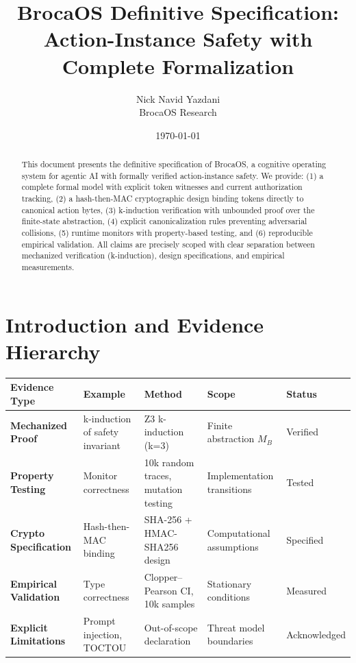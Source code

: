 \documentclass[12pt]{article}
\title{BrocaOS Definitive Specification: Action-Instance Safety with Complete Formalization}
\author{Nick Navid Yazdani\\BrocaOS Research}
\date{\today}
\begin{document}
\maketitle

\begin{abstract}
This document presents the definitive specification of BrocaOS, a cognitive operating system for agentic AI with formally verified action-instance safety. We provide: (1) a complete formal model with explicit token witnesses and current authorization tracking, (2) a hash-then-MAC cryptographic design binding tokens directly to canonical action bytes, (3) k-induction verification with unbounded proof over the finite-state abstraction, (4) explicit canonicalization rules preventing adversarial collisions, (5) runtime monitors with property-based testing, and (6) reproducible empirical validation. All claims are precisely scoped with clear separation between mechanized verification (k-induction), design specifications, and empirical measurements.
\end{abstract}

\section{Introduction and Evidence Hierarchy}

\begin{center}
\small
\begin{tabular}{@{}p{}p{}p{}p{}p{}@{}}
\toprule
\textbf{Evidence Type} & \textbf{Example} & \textbf{Method} & \textbf{Scope} & \textbf{Status} \\
\midrule
\textbf{Mechanized Proof} & k-induction of safety invariant & Z3 k-induction (k=3) & Finite abstraction $M_B$ & Verified \\
\textbf{Property Testing} & Monitor correctness & 10k random traces, mutation testing & Implementation transitions & Tested \\
\textbf{Crypto Specification} & Hash-then-MAC binding & SHA-256 + HMAC-SHA256 design & Computational assumptions & Specified \\
\textbf{Empirical Validation} & Type correctness & Clopper--Pearson CI, 10k samples & Stationary conditions & Measured \\
\textbf{Explicit Limitations} & Prompt injection, TOCTOU & Out-of-scope declaration & Threat model boundaries & Acknowledged \\
\bottomrule
\end{tabular}
\end{center}
\end{document}
